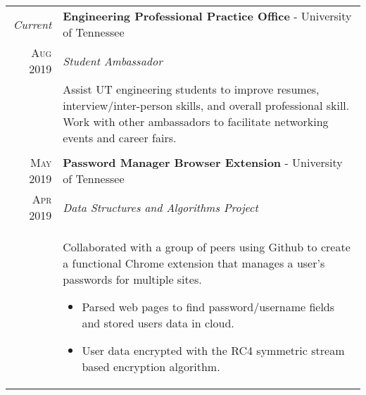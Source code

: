 \documentclass[a4paper,11pt]{article}
\begin{document}
\begin{tabularx}{\textwidth}{r|X}

   \emph{Current} & \textbf{Engineering Professional Practice Office} \-- University of Tennessee\\
   \textsc{Aug 2019} & \emph{Student Ambassador}\\
   & \small{Assist UT engineering students to improve resumes, interview/inter-person skills, and overall professional skill.
            Work with other ambassadors to facilitate networking events and career fairs.
   }\\

   \multicolumn{2}{c}{} \\

   \textsc{May 2019} & \textbf{Password Manager Browser Extension} \-- University of Tennessee\\
   \textsc{Apr 2019} & \emph{Data Structures and Algorithms Project}\\
   & \small{Collaborated with a group of peers using Github to create a functional Chrome extension that manages a user's passwords for multiple sites.
      \begin{itemize}[leftmargin=20pt,topsep=1pt,itemsep=1pt,partopsep=0pt, parsep=1pt]
         \item Parsed web pages to find password/username fields and stored users data in cloud.
         \item User data encrypted with the RC4 symmetric stream based encryption algorithm.
      \vspace{-0.5cm}
      \end{itemize}}\\
\end{tabularx}

\end{document}
